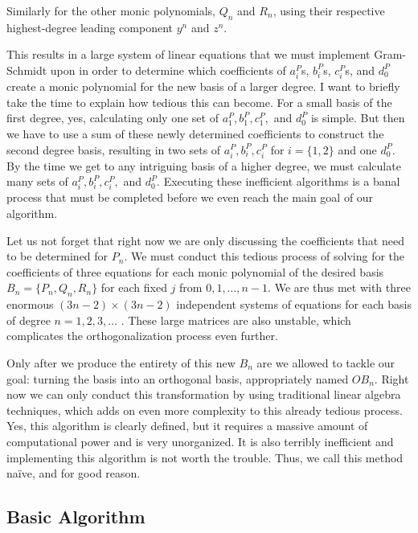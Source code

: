 \documentclass[letterpaper, 12pt]{article}
\begin{document}
\doublespacing
\smallskip
\noindent Similarly for the other monic polynomials, $Q_n$ and $R_n$, using their respective highest-degree leading component $y^n$ and $z^n$.

This results in a large system of linear equations that we must implement Gram-Schmidt upon in order to determine which coefficients of $a_i^P$s, $b_i^P$s, $c_i^P$s, and $d_0^P$ create a monic polynomial for the new basis of a larger degree. I want to briefly take the time to explain how tedious this can become. For a small basis of the first degree, yes, calculating only one set of $a_1^P, b_1^P, c_1^P,$ and $d_0^P$ is simple. But then we have to use a sum of these newly determined coefficients to construct the second degree basis, resulting in two sets of $a_i^P,b_i^P,c_i^P$ for $i=\{1,2\}$ and one $d_0^P$. By the time we get to any intriguing basis of a higher degree, we must calculate many sets of $a_i^P,b_i^P,c_i^P,$ and $d_0^P$. Executing these inefficient algorithms is a banal process that must be completed before we even reach the main goal of our algorithm. 

Let us not forget that right now we are only discussing the coefficients that need to be determined for $P_n$. We must conduct this tedious process of solving for the coefficients of three equations for each monic polynomial of the desired basis $B_n = \{P_n, Q_n, R_n\}$ for each fixed $j$ from $0, 1, \ldots, n-1$. We are thus met with three enormous $(3n-2)\times(3n-2)$ independent systems of equations for each basis of degree $n = 1, 2, 3, \ldots$ . These large matrices are also unstable, which complicates the orthogonalization process even further.

Only after we produce the entirety of this new $B_n$ are we allowed to tackle our goal: turning the basis into an orthogonal basis, appropriately named $OB_n$. Right now we can only conduct this transformation by using traditional linear algebra techniques, which adds on even more complexity to this already tedious process. Yes, this algorithm is clearly defined, but it requires a massive amount of computational power and is very unorganized. It is also terribly inefficient and implementing this algorithm is not worth the trouble. Thus, we call this method na\"ive, and for good reason. 







\newpage
\begin{centering}\section{Basic Algorithm}\end{centering}
\end{document}
